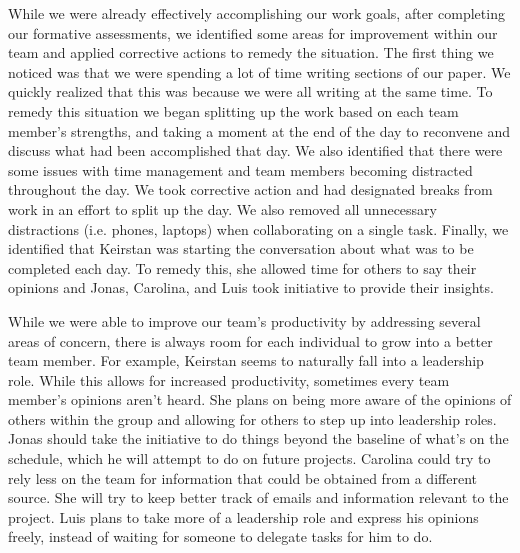 \par While we were already effectively accomplishing our work goals, after completing our formative assessments, we identified some areas for improvement within our team and applied corrective actions to remedy the situation. The first thing we noticed was that we were spending a lot of time writing sections of our paper. We quickly realized that this was because we were all writing at the same time. To remedy this situation we began splitting up the work based on each team member’s strengths, and taking a moment at the end of the day to reconvene and discuss what had been accomplished that day. We also identified that there were some issues with time management and team members becoming distracted throughout the day. We took corrective action and had designated breaks from work in an effort to split up the day. We also removed all unnecessary distractions (i.e. phones, laptops) when collaborating on a single task. Finally, we identified that Keirstan was starting the conversation about what was to be completed each day. To remedy this, she allowed time for others to say their opinions and Jonas, Carolina, and Luis took initiative to provide their insights.
\par While we were able to improve our team’s productivity by addressing several areas of concern, there is always room for each individual to grow into a better team member. For example, Keirstan seems to naturally fall into a leadership role. While this allows for increased productivity, sometimes every team member’s opinions aren’t heard. She plans on being more aware of the opinions of others within the group and allowing for others to step up into leadership roles. Jonas should take the initiative to do things beyond the baseline of what’s on the schedule, which he will attempt to do on future projects. Carolina could try to rely less on the team for information that could be obtained from a different source. She will try to keep better track of emails and information relevant to the project. Luis plans to take more of a leadership role and express his opinions freely, instead of waiting for someone to delegate tasks for him to do.



